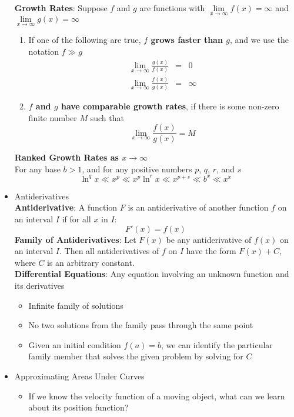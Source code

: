 \documentclass{article}
\begin{document}
\begin{itemize}
\begin{enumerate}
    \end{enumerate}
    \textbf{Growth Rates}: Suppose $f$ and $g$ are functions with $\lim\limits_{x \to \infty}{f(x)} = \infty$ and $\lim\limits_{x \to \infty}{g(x)} = \infty$ \\
    \begin{enumerate}
        \item If one of the following are true, \textbf{$f$ grows faster than $g$}, and we use the notation $f \gg g$
        \begin{eqnarray}
            \lim_{x \to \infty}{\frac{g(x)}{f(x)}} &=& 0 \\
            \lim_{x \to \infty}{\frac{f(x)}{g(x)}} &=& \infty
        \end{eqnarray}
        \item \textbf{$f$ and $g$ have comparable growth rates}, if there is some non-zero finite number $M$ such that
        $$\lim_{x \to \infty}{\frac{f(x)}{g(x)}} = M$$
    \end{enumerate}
    \textbf{Ranked Growth Rates as $x \to \infty$} \\
    For any base $b > 1$, and for any positive numbers $p$, $q$, $r$, and $s$
    $$\ln^q{x} \ll x^p \ll x^p \ln^r{x} \ll x^{p + s} \ll b^x \ll x^x$$
    \item Antiderivatives \\
    \textbf{Antiderivative}: A function $F$ is an antiderivative of another function $f$ on an interval $I$ if for all $x$ in $I$:
    $$F'(x) = f(x)$$
    \textbf{Family of Antiderivatives}: Let $F(x)$ be any antiderivative of $f(x)$ on an interval $I$. Then all antiderivatives of $f$ on $I$ have the form $F(x) + C$, where $C$ is an arbitrary constant. \\
    \textbf{Differential Equations}: Any equation involving an unknown function and its derivatives
    \begin{itemize}
        \item Infinite family of solutions
        \item No two solutions from the family pass through the same point
        \item Given an initial condition $f(a) = b$, we can identify the particular family member that solves the given problem by solving for $C$
    \end{itemize}
    \item Approximating Areas Under Curves
    \begin{itemize}
        \item If we know the velocity function of a moving object, what can we learn about its position function?

\end{itemize}
\end{itemize}
\end{document}
